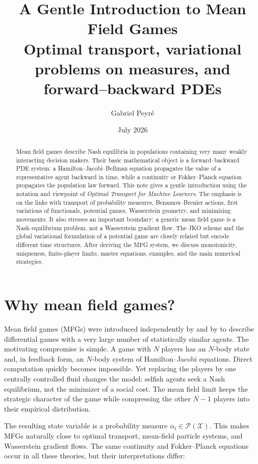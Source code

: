 \documentclass[11pt,a4paper]{article}
\title{A Gentle Introduction to Mean Field Games\\
  \large Optimal transport, variational problems on measures, and forward--backward PDEs}
\author{Gabriel Peyr\'e}
\date{July 2026}
\theoremstyle{definition}
\newcommand{\Pp}{\mathcal P}
\newcommand{\al}{\alpha}
\begin{document}
\maketitle

\begin{abstract}
Mean field games describe Nash equilibria in populations containing very many
weakly interacting decision makers.  Their basic mathematical object is a
forward--backward PDE system: a Hamilton--Jacobi--Bellman equation propagates
the value of a representative agent backward in time, while a continuity or
Fokker--Planck equation propagates the population law forward.  This note gives
a gentle introduction using the notation and viewpoint of \emph{Optimal
Transport for Machine Learners}.  The emphasis is on the links with transport
of probability measures, Benamou--Brenier actions, first variations of
functionals, potential games, Wasserstein geometry, and minimizing movements.
It also stresses an important boundary: a generic mean field game is a Nash
equilibrium problem, not a Wasserstein gradient flow.  The JKO scheme and the
global variational formulation of a potential game are closely related but
encode different time structures.  After deriving the MFG system, we discuss
monotonicity, uniqueness, finite-player limits, master equations, examples,
and the main numerical strategies.
\end{abstract}

\tableofcontents

\section{Why mean field games?}

Mean field games (MFGs) were introduced independently by
\citet{LasryLions2006a,LasryLions2006b,LasryLions2007} and by
\citet{HuangMalhameCaines2006} to describe differential games with a very
large number of statistically similar agents.  The motivating compromise is
simple.  A game with $N$ players has an $N$-body state and, in feedback
form, an $N$-body system of Hamilton--Jacobi equations.  Direct computation
quickly becomes impossible.  Yet replacing the players by one centrally
controlled fluid changes the model: selfish agents seek a Nash equilibrium,
not the minimizer of a social cost.  The mean field limit keeps the strategic
character of the game while compressing the other $N-1$ players into their
empirical distribution.

The resulting state variable is a probability measure
$\al_t\in\Pp(\mathcal X)$.  This makes MFGs naturally close to optimal
transport, mean-field particle systems, and Wasserstein gradient flows.  The
same continuity and Fokker--Planck equations occur in all these theories, but
their interpretations differ:
\end{document}
